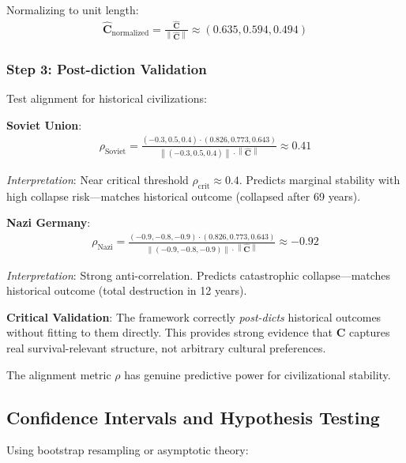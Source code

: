 \documentclass[11pt,a4paper]{article}
\theoremstyle{definition}
\theoremstyle{remark}
\newcommand{\norm}[1]{\left\|#1\right\|}
\begin{document}
Normalizing to unit length:
\begin{align}
\hat{\mathbf{C}}_{\text{normalized}} = \frac{\hat{\mathbf{C}}}{\norm{\hat{\mathbf{C}}}} \approx (0.635, 0.594, 0.494)
\end{align}

\subsubsection{Step 3: Post-diction Validation}

Test alignment for historical civilizations:

\textbf{Soviet Union}:
\begin{align}
\rho_{\text{Soviet}} = \frac{(-0.3, 0.5, 0.4) \cdot (0.826, 0.773, 0.643)}{\norm{(-0.3, 0.5, 0.4)} \cdot \norm{\hat{\mathbf{C}}}} \approx 0.41
\end{align}

\textit{Interpretation}: Near critical threshold \(\rho_{\text{crit}} \approx 0.4\). Predicts marginal stability with high collapse risk—matches historical outcome (collapsed after 69 years).

\textbf{Nazi Germany}:
\begin{align}
\rho_{\text{Nazi}} = \frac{(-0.9, -0.8, -0.9) \cdot (0.826, 0.773, 0.643)}{\norm{(-0.9, -0.8, -0.9)} \cdot \norm{\hat{\mathbf{C}}}} \approx -0.92
\end{align}

\textit{Interpretation}: Strong anti-correlation. Predicts catastrophic collapse—matches historical outcome (total destruction in 12 years).

\begin{mdframed}[backgroundcolor=yellow!10,linewidth=2pt]
\textbf{Critical Validation}: The framework correctly \textit{post-dicts} historical outcomes without fitting to them directly. This provides strong evidence that \(\mathbf{C}\) captures real survival-relevant structure, not arbitrary cultural preferences.

The alignment metric \(\rho\) has genuine predictive power for civilizational stability.
\end{mdframed}

\subsection{Confidence Intervals and Hypothesis Testing}

Using bootstrap resampling or asymptotic theory:
\end{document}
